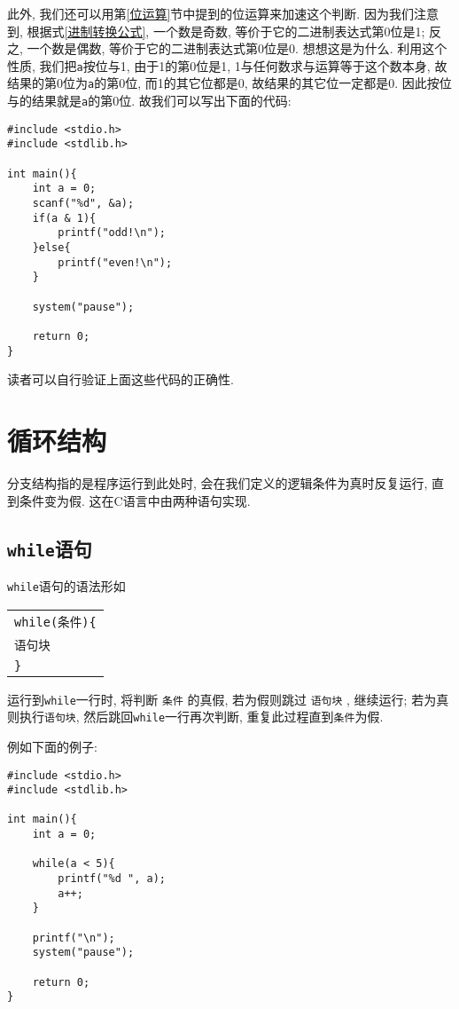         \begin{mdframed}[linecolor=darkgray]
        此外, 我们还可以用第\ref{位运算}节中提到的位运算来加速这个判断. 因为我们注意到, 根据式\ref{进制转换公式}, 一个数是奇数, 等价于它的二进制表达式第0位是1; 反之, 一个数是偶数, 等价于它的二进制表达式第0位是0. 想想这是为什么. 利用这个性质, 我们把\texttt{a}按位与1, 由于1的第0位是1, 1与任何数求与运算等于这个数本身, 故结果的第0位为\texttt{a}的第0位, 而1的其它位都是0, 故结果的其它位一定都是0. 因此按位与的结果就是\texttt{a}的第0位. 故我们可以写出下面的代码:
\begin{lstlisting}
#include <stdio.h>
#include <stdlib.h>

int main(){
    int a = 0;
    scanf("%d", &a);
    if(a & 1){
        printf("odd!\n");
    }else{
        printf("even!\n");
    }
    
    system("pause");

    return 0;
}
\end{lstlisting}
        \end{mdframed}

        读者可以自行验证上面这些代码的正确性.

    \section{循环结构} \label{循环结构}
        分支结构指的是程序运行到此处时, 会在我们定义的逻辑条件为真时反复运行, 直到条件变为假. 这在C语言中由两种语句实现.

        \subsection*{\texttt{while}语句}
            \texttt{\texttt{while}}语句的语法形如
            \begin{center}
            \begin{longtable}{l}
                \texttt{while(条件)\{} \\
                \qquad \texttt{语句块} \\
                \texttt{\}} 
            \end{longtable}
            \end{center}
            
            运行到\texttt{while}一行时, 将判断 \texttt{条件} 的真假, 若为假则跳过 \texttt{语句块} , 继续运行; 若为真则执行\texttt{语句块}, 然后跳回\texttt{while}一行再次判断, 重复此过程直到\texttt{条件}为假.

            例如下面的例子:
\begin{lstlisting}
#include <stdio.h>
#include <stdlib.h>

int main(){
    int a = 0;

    while(a < 5){
        printf("%d ", a);
        a++;
    }

    printf("\n");
    system("pause");

    return 0;
}
\end{lstlisting}

